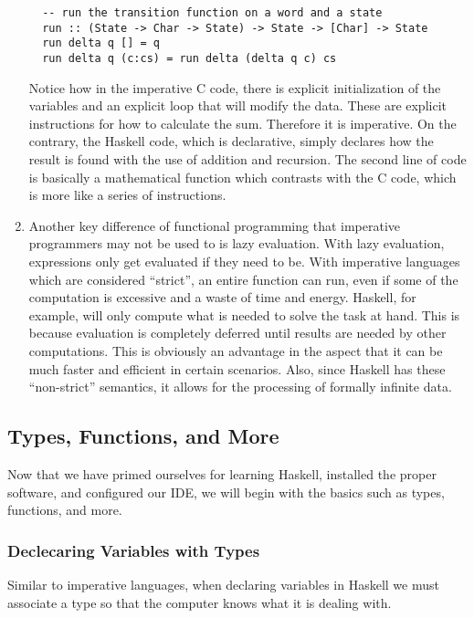 \documentclass{article}
\begin{document}
\begin{enumerate}
  \begin{lstlisting}
  -- run the transition function on a word and a state
  run :: (State -> Char -> State) -> State -> [Char] -> State
  run delta q [] = q
  run delta q (c:cs) = run delta (delta q c) cs 
  \end{lstlisting}

  Notice how in the imperative C code, there is explicit initialization of the variables and an explicit loop that will modify the data. These are explicit instructions for how to calculate the sum. Therefore it is imperative. On the contrary, the Haskell code, which is declarative, simply declares how the result is found with the use of addition and recursion. The second line of code is basically a mathematical function which contrasts with the C code, which is more like a series of instructions.

  \item Another key difference of functional programming that imperative programmers may not be used to is lazy evaluation. With lazy evaluation, expressions only get evaluated if they need to be. With imperative languages which are considered “strict”, an entire function can run, even if some of the computation is excessive and a waste of time and energy. Haskell, for example, will only compute what is needed to solve the task at hand. This is because evaluation is completely deferred until results are needed by other computations. This is obviously an advantage in the aspect that it can be much faster and efficient in certain scenarios. Also, since Haskell has these “non-strict” semantics, it allows for the processing of formally infinite data.
\end{enumerate}

\subsection{Types, Functions, and More}
\medskip\noindent
Now that we have primed ourselves for learning Haskell, installed the proper software, and configured our IDE, we will begin with the basics such as types, functions, and more.

\subsubsection{Declecaring Variables with Types}
\medskip\noindent
Similar to imperative languages, when declaring variables in Haskell we must associate a type so that the computer knows what it is dealing with. 
\end{document}
